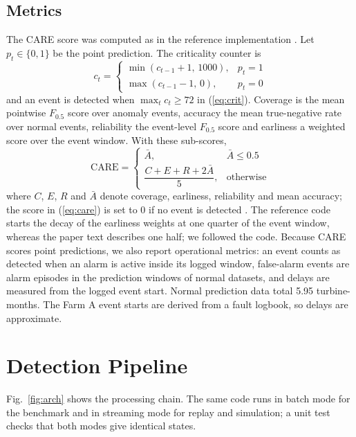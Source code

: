 \documentclass[conference]{IEEEtran}
\begin{document}
\subsection{Metrics}
The CARE score was computed as in the reference implementation \cite{efd2026}. Let $p_t\in\{0,1\}$ be the point prediction. The criticality counter is
\begin{equation}
c_t=\begin{cases}\min(c_{t-1}+1,\,1000), & p_t=1\\ \max(c_{t-1}-1,\,0), & p_t=0\end{cases}\label{eq:crit}
\end{equation}
and an event is detected when $\max_t c_t\geq 72$ in (\ref{eq:crit}). Coverage is the mean pointwise $F_{0.5}$ score over anomaly events, accuracy the mean true-negative rate over normal events, reliability the event-level $F_{0.5}$ score and earliness a weighted score over the event window. With these sub-scores,
\begin{equation}
\mathrm{CARE}=\begin{cases}\bar{A}, & \bar{A}\leq 0.5\\ \dfrac{C+E+R+2\bar{A}}{5}, & \text{otherwise}\end{cases}\label{eq:care}
\end{equation}
where $C$, $E$, $R$ and $\bar{A}$ denote coverage, earliness, reliability and mean accuracy; the score in (\ref{eq:care}) is set to 0 if no event is detected \cite{gueck2024care}. The reference code starts the decay of the earliness weights at one quarter of the event window, whereas the paper text describes one half; we followed the code. Because CARE scores point predictions, we also report operational metrics: an event counts as detected when an alarm is active inside its logged window, false-alarm events are alarm episodes in the prediction windows of normal datasets, and delays are measured from the logged event start. Normal prediction data total 5.95 turbine-months. The Farm A event starts are derived from a fault logbook, so delays are approximate.

\section{Detection Pipeline}
Fig.~\ref{fig:arch} shows the processing chain. The same code runs in batch mode for the benchmark and in streaming mode for replay and simulation; a unit test checks that both modes give identical states.
\end{document}
